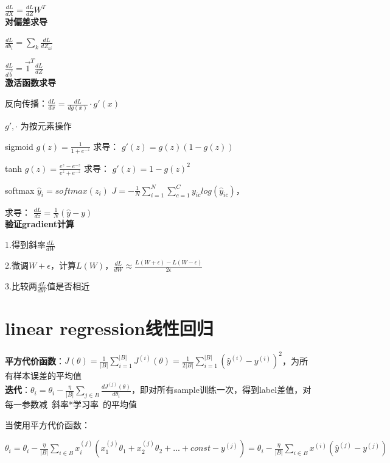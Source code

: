 \documentclass[UTF8]{ctexart}
\begin{document}
  $\frac{dL}{dX} = \frac{dL}{dZ}W^T$\\
\textbf{对偏差求导}

  $\frac{dL}{db_i} = \sum_k \frac{dL}{dZ_{ki}}$

  $\frac{dL}{d\vec{b}} = \vec{1}^T\frac{dL}{dZ}$\\
\textbf{激活函数求导}

  反向传播：$\frac{dL}{dx} = \frac{dL}{dg(x)} \cdot g'(x)$
  
  \quad $g', \cdot$ 为按元素操作

  sigmoid $g(z) = \frac{1}{1 + e^{-z}}$ 求导： $g'(z) = g(z)(1 - g(z))$

  tanh $g(z) = \frac{e^z - e^{-z}}{e^z + e^{-z}}$ 求导： $g'(z) = 1 - g(z)^2$

  softmax $\hat{y}_i = softmax(z_i)$ $J = -\frac{1}{N}\sum_{i=1}^{N}\sum_{c=1}^{C}y_{ic}log(\hat{y}_{ic})$，
  
  \quad 求导： $\frac{dL}{dz} = \frac{1}{N}(\hat{y} - y)$\\
\textbf{验证gradient计算}

  1.得到斜率$\frac{dL}{dW}$

  2.微调$W + \epsilon$，计算$L(W)$，$\frac{dL}{dW} \approx \frac{L(W + \epsilon) - L(W - \epsilon)}{2\epsilon}$

  3.比较两$\frac{dL}{dW}$值是否相近

\section{linear regression线性回归}
\noindent \textbf{平方代价函数}：$J(\theta ) = \frac{1}{|B|} \sum_{i = 1}^{|B|} J^{(i)}(\theta ) = \frac{1}{2|B|} \sum_{i = 1}^{|B|} (\hat{y}^{(i)} - y^{(i)})^2  $，为所有样本误差的平均值\\
\textbf{迭代}：$\theta_i = \theta_i - \frac{\eta}{|B|}\sum_{j\in B} \frac{d J^{(j)}(\theta)}{d \theta_i}$，即对所有sample训练一次，得到label差值，对每一参数减\ 斜率*学习率\ 的平均值
  
  当使用平方代价函数：
  
  \quad $\theta_i = \theta_i - \frac{\eta}{|B|}\sum_{i\in B} x^{(j)}_i(x^{(j)}_1\theta_1 + x^{(j)}_2\theta_2 + ... + const - y^{(j)}) = \theta_i - \frac{\eta}{|B|}\sum_{i\in B}x^{(i)}(\hat{y}^{(j)} - y^{(j)})$
\end{document}
